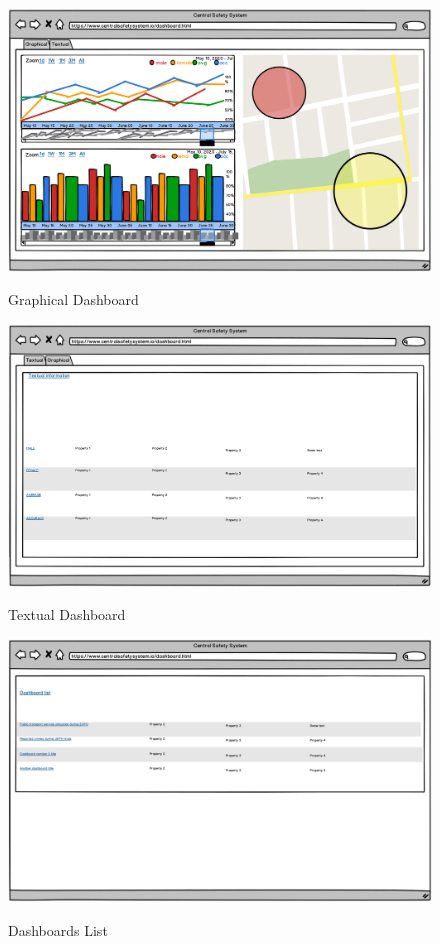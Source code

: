 \documentclass[../main.tex]{subfiles}
\begin{document}
    \begin{figure}[H]
        \centering
        \includegraphics[scale = 0.33]{assets/wireframes/wire5.png} \\
        \caption[]{Graphical Dashboard}\label{fig:figure10}
    \end{figure}
    \begin{figure}[H]
        \centering
        \includegraphics[scale = 0.33]{assets/wireframes/wire6.png} \\
        \caption[]{Textual Dashboard}\label{fig:figure11}
    \end{figure}
    \begin{figure}[H]
        \centering
        \includegraphics[scale = 0.33]{assets/wireframes/wire7.png} \\
        \caption[]{Dashboards List}\label{fig:figure12}
    \end{figure}
\end{document}
